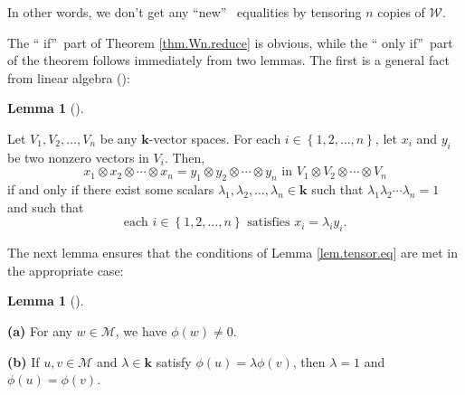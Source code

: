 \documentclass[numbers=enddot,12pt,final,onecolumn,notitlepage]{scrartcl}%
\theoremstyle{definition}
\newtheorem{lem}[theo]{Lemma}
\newenvironment{lemma}[1][]
{\begin{lem}[#1]\begin{leftbar}}
{\end{leftbar}\end{lem}}
\newcommand{\W}{\mathcal{W}}
\newcommand{\M}{\mathcal{M}}
\newcommand{\kk}{\mathbf{k}}
\begin{document}
In other words, we don't get any \textquotedblleft new\textquotedblright%
\ equalities by tensoring $n$ copies of $\W$.

The \textquotedblleft
if\textquotedblright\ part of Theorem \ref{thm.Wn.reduce} is obvious, while the \textquotedblleft
only if\textquotedblright\ part of the theorem follows immediately from two lemmas. The first is a
general fact from linear algebra (\cite[Theorem 5.15]{KConrad-tp2}):

\begin{lemma}
\label{lem.tensor.eq}Let $V_{1},V_{2},\ldots,V_{n}$ be any $\kk$-vector
spaces. For each $i\in\left\{  1,2,\ldots,n\right\}  $, let $x_{i}$ and
$y_{i}$ be two nonzero vectors in $V_{i}$. Then,
\[
x_{1}\otimes x_{2}\otimes\cdots\otimes x_{n}=y_{1}\otimes y_{2}\otimes
\cdots\otimes y_{n}\text{ in }V_{1}\otimes V_{2}\otimes\cdots\otimes V_{n}%
\]
if and only if there exist some scalars $\lambda_{1},\lambda_{2}%
,\ldots,\lambda_{n}\in\kk$ such that $\lambda_{1}\lambda_{2}%
\cdots\lambda_{n}=1$ and such that
\[
\text{each }i\in\left\{  1,2,\ldots,n\right\}  \text{ satisfies }x_{i}%
=\lambda_{i}y_{i}.
\]

\end{lemma}

The next lemma ensures that the conditions of Lemma \ref{lem.tensor.eq} are
met in the appropriate case:

\begin{lemma}
\label{lem.Wn.scalar1}\textbf{(a)} For any $w\in\M$, we have
$\phi\left(  w\right)  \neq0$.

\textbf{(b)} If $u,v\in\M$ and $\lambda\in\kk$ satisfy
$\phi\left(  u\right)  =\lambda\phi\left(  v\right)  $, then $\lambda=1$ and
$\phi\left(  u\right)  =\phi\left(  v\right)  $.
\end{lemma}
\end{document}
